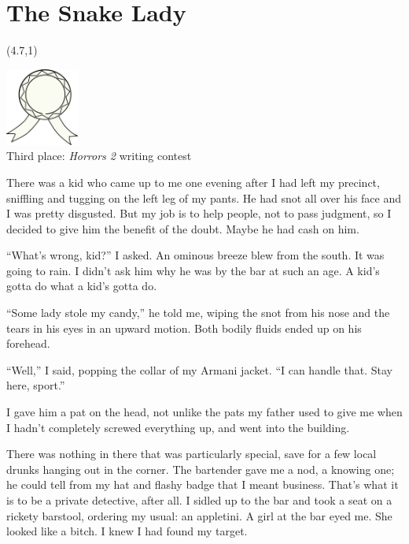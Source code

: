 \chapter{The Snake Lady}

\begin{textblock}{1.5}(4.7,1)
\begin{center}
\includegraphics[height=1in]{art/white-ribbon.pdf} \\
{\scriptsize Third place: {\em Horrors 2} writing contest}
\end{center}
\end{textblock}

\noindent There was a kid who came up to me one evening after I had left my
precinct, sniffling and tugging on the left leg of my pants. He had
snot all over his face and I was pretty disgusted. But my job is to
help people, not to pass judgment, so I decided to give him the
benefit of the doubt. Maybe he had cash on him.

``What's wrong, kid?'' I asked. An ominous breeze
blew from the south. It was going to rain. I didn't ask him
why he was by the bar at such an age. A kid's gotta do what a
kid's gotta do.

``Some lady stole my candy,'' he told me, wiping the snot
from his nose and the tears in his eyes in an upward motion. Both
bodily fluids ended up on his forehead.

``Well,'' I said, popping the collar of my Armani jacket.
``I can handle that. Stay here, sport.''

I gave him a pat on the head, not unlike the pats my father used to
give me when I hadn't completely screwed everything up, and
went into the building.



There was nothing in there that was particularly special, save for
a few local drunks hanging out in the corner. The bartender gave me
a nod, a knowing one; he could tell from my hat and flashy badge
that I meant business. That's what it is to be a private
detective, after all. I sidled up to the bar and took a seat on a
rickety barstool, ordering my usual: an appletini. A girl at the
bar eyed me. She looked like a bitch. I knew I had found my
target.



